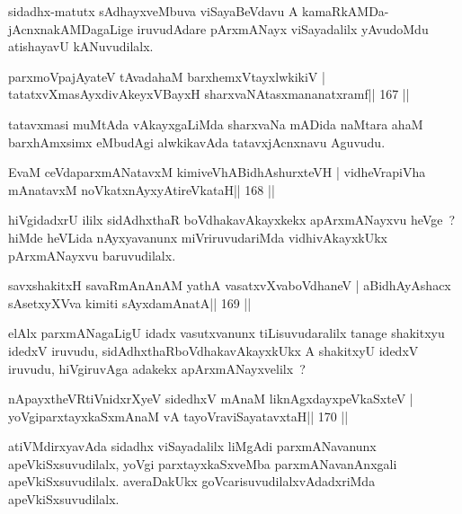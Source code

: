 \begin{artha}
sidadhx-matutx sAdhayxveMbuva viSayaBeVdavu A kamaRkAMDa-jAcnxnakAMDagaLige iruvudAdare pArxmANayx viSayadalilx yAvudoMdu atishayavU kANuvudilalx.
\end{artha}

\begin{shl}
parxmoVpajAyateV tAvadahaM barxhemxVtayxlwkikiV |
tatatxvXmasAyxdivAkeyxVBayxH sharxvaNAtasxmananatxramf\hfill || 167 ||
\end{shl}

\begin{artha}
tatavxmasi muMtAda vAkayxgaLiMda sharxvaNa mADida naMtara ahaM barxhAmxsimx eMbudAgi  alwkikavAda tatavxjAcnxnavu Aguvudu.
\end{artha}

\begin{shl}
EvaM ceVdaparxmANatavxM kimiveVhABidhAshurxteVH |
vidheVrapiVha mAnatavxM noVkatxnAyxyAtireVkataH\hfill || 168 ||
\end{shl}

\begin{artha}
hiVgidadxrU ililx sidAdhxthaR boVdhakavAkayxkekx apArxmANayxvu heVge~? hiMde heVLida nAyxyavanunx miVriruvudariMda vidhivAkayxkUkx pArxmANayxvu baruvudilalx.
\end{artha}

\begin{shl}
savxshakitxH savaRmAnAnAM yathA vasatxvXvaboVdhaneV |
aBidhAyAshacx sA\s setxyXVva kimiti sAyxdamAnatA\hfill || 169 ||
\end{shl}

\begin{artha}
elAlx parxmANagaLigU idadx vasutxvanunx tiLisuvudaralilx tanage shakitxyu idedxV iruvudu, sidAdhxthaRboVdhakavAkayxkUkx A shakitxyU idedxV iruvudu, hiVgiruvAga adakekx apArxmANayxvelilx~? 
\end{artha}

\begin{shl}
nApayxtheVR\s tiVnidxrXyeV sidedhxV mAnaM liknAgxdayxpeVkaSxteV |
yoVgiparxtayxkaSxmAnaM vA tayoVraviSayatavxtaH\hfill || 170 ||
\end{shl}

\begin{artha}
atiVMdirxyavAda sidadhx viSayadalilx liMgAdi parxmANavanunx apeVkiSxsuvudilalx, yoVgi parxtayxkaSxveMba parxmANavanAnxgali apeVkiSxsuvudilalx. averaDakUkx goVcarisuvudilalxvAdadxriMda apeVkiSxsuvudilalx.
\end{artha}

